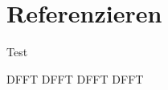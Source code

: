 \documentclass[a4paper, ngerman, oneside, 10pt]{article}
\begin{document}
\section{Referenzieren}\label{sec:ref}
Test \cite{Kleiner.2022}

\ac{DFFT}	%
\ac{DFFT}	%
\acf{DFFT}	%
\acs{DFFT}	%


%
\clearpage
{}
\listoffigures
\listoftables
\printbibliography

\end{document}
